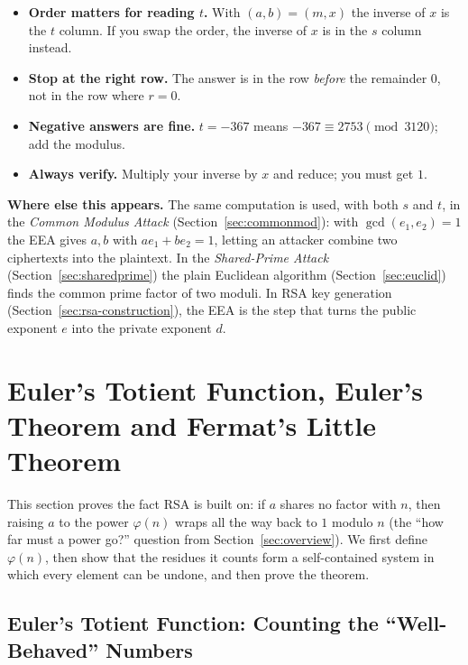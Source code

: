 \documentclass[11pt]{article}
\theoremstyle{definition}
\theoremstyle{remark}
\begin{document}
\begin{warn}
\begin{itemize}[nosep]
\item \textbf{Order matters for reading $t$.} With $(a,b)=(m,x)$ the inverse of $x$ is the $t$ column. If you swap the order, the inverse of $x$ is in the $s$ column instead.
\item \textbf{Stop at the right row.} The answer is in the row \emph{before} the remainder $0$, not in the row where $r=0$.
\item \textbf{Negative answers are fine.} $t=-367$ means $-367\equiv2753 \pmod{3120}$; add the modulus.
\item \textbf{Always verify.} Multiply your inverse by $x$ and reduce; you must get $1$.
\end{itemize}
\end{warn}

\textbf{Where else this appears.} The same computation is used, with both $s$ and $t$, in the \emph{Common Modulus Attack} (Section~\ref{sec:commonmod}): with $\gcd(e_1,e_2)=1$ the EEA gives $a,b$ with $ae_1+be_2=1$, letting an attacker combine two ciphertexts into the plaintext. In the \emph{Shared-Prime Attack} (Section~\ref{sec:sharedprime}) the plain Euclidean algorithm (Section~\ref{sec:euclid}) finds the common prime factor of two moduli. In RSA key generation (Section~\ref{sec:rsa-construction}), the EEA is the step that turns the public exponent $e$ into the private exponent $d$.


\newpage
\section{Euler's Totient Function, Euler's Theorem and Fermat's Little Theorem}\label{sec:euler}

This section proves the fact RSA is built on: if $a$ shares no factor with $n$, then raising $a$ to the power $\varphi(n)$ wraps all the way back to $1$ modulo $n$ (the ``how far must a power go?'' question from Section~\ref{sec:overview}). We first define $\varphi(n)$, then show that the residues it counts form a self-contained system in which every element can be undone, and then prove the theorem.

\subsection{Euler's Totient Function: Counting the ``Well-Behaved'' Numbers}
\end{document}

